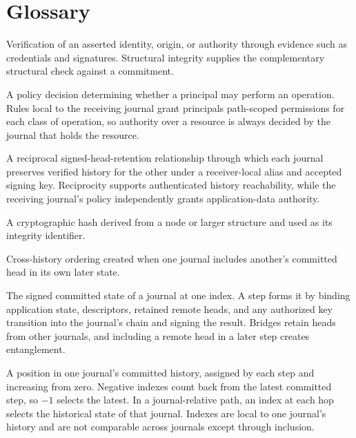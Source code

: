 \section*{Glossary}
\label{sec:glossary}

\begin{description}[style=nextline]
    Verification of an asserted identity, origin, or authority through evidence such as credentials and signatures. Structural integrity supplies the complementary structural check against a commitment.

    A policy decision determining whether a principal may perform an operation. Rules local to the receiving journal grant principals path-scoped permissions for each class of operation, so authority over a resource is always decided by the journal that holds the resource.

    A reciprocal signed-head-retention relationship through which each journal preserves verified history for the other under a receiver-local alias and accepted signing key. Reciprocity supports authenticated history reachability, while the receiving journal's policy independently grants application-data authority.

    A cryptographic hash derived from a node or larger structure and used as its integrity identifier.

    Cross-history ordering created when one journal includes another's committed head in its own later state.

    The signed committed state of a journal at one index. A step forms it by binding application state, descriptors, retained remote heads, and any authorized key transition into the journal's chain and signing the result. Bridges retain heads from other journals, and including a remote head in a later step creates entanglement.

    A position in one journal's committed history, assigned by each step and increasing from zero. Negative indexes count back from the latest committed step, so $-1$ selects the latest. In a journal-relative path, an index at each hop selects the historical state of that journal. Indexes are local to one journal's history and are not comparable across journals except through inclusion.


\end{description}
